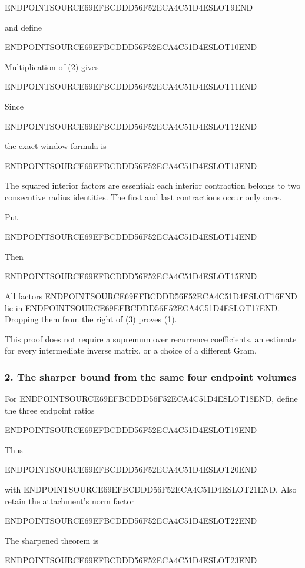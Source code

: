 ENDPOINTSOURCE69EFBCDDD56F52ECA4C51D4ESLOT9END

and define

ENDPOINTSOURCE69EFBCDDD56F52ECA4C51D4ESLOT10END

Multiplication of (2) gives

ENDPOINTSOURCE69EFBCDDD56F52ECA4C51D4ESLOT11END

Since

ENDPOINTSOURCE69EFBCDDD56F52ECA4C51D4ESLOT12END

the exact window formula is

ENDPOINTSOURCE69EFBCDDD56F52ECA4C51D4ESLOT13END

The squared interior factors are essential: each interior contraction belongs to two consecutive radius identities. The first and last contractions occur only once.

Put

ENDPOINTSOURCE69EFBCDDD56F52ECA4C51D4ESLOT14END

Then

ENDPOINTSOURCE69EFBCDDD56F52ECA4C51D4ESLOT15END

All factors ENDPOINTSOURCE69EFBCDDD56F52ECA4C51D4ESLOT16END lie in ENDPOINTSOURCE69EFBCDDD56F52ECA4C51D4ESLOT17END. Dropping them from the right of (3) proves (1).

This proof does not require a supremum over recurrence coefficients, an estimate for every intermediate inverse matrix, or a choice of a different Gram.

\subsubsection{2. The sharper bound from the same four endpoint volumes}\label{endpoint-user_product_original--the-sharper-bound-from-the-same-four-endpoint-volumes}

For ENDPOINTSOURCE69EFBCDDD56F52ECA4C51D4ESLOT18END, define the three endpoint ratios

ENDPOINTSOURCE69EFBCDDD56F52ECA4C51D4ESLOT19END

Thus

ENDPOINTSOURCE69EFBCDDD56F52ECA4C51D4ESLOT20END

with ENDPOINTSOURCE69EFBCDDD56F52ECA4C51D4ESLOT21END. Also retain the attachment's norm factor

ENDPOINTSOURCE69EFBCDDD56F52ECA4C51D4ESLOT22END

The sharpened theorem is

ENDPOINTSOURCE69EFBCDDD56F52ECA4C51D4ESLOT23END

